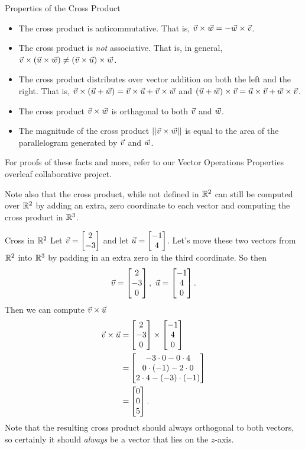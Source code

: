 \begin{definition}{\hypertarget{crossprops}{Properties of the Cross Product}}
\begin{itemize}
\item The cross product is anticommutative. That is, $\vec{v}\times\vec{w}=-\vec{w}\times\vec{v}$.
\vspace{1em}
\item The cross product is \textit{not} associative. That is, in general, $\vec{v}\times(\vec{u}\times\vec{w})\neq(\vec{v}\times\vec{u})\times\vec{w}$.
\vspace{1em}
\item The cross product distributes over vector addition on both the left and the right. That is, $\vec{v}\times(\vec{u}+\vec{w})=\vec{v}\times\vec{u}+\vec{v}\times\vec{w}$ and $(\vec{u}+\vec{w})\times\vec{v}=\vec{u}\times\vec{v}+\vec{w}\times\vec{v}$.
\vspace{1em}
\item The cross product $\vec{v}\times\vec{w}$ is orthagonal to both $\vec{v}$ and $\vec{w}$.
\vspace{1em}
\item The magnitude of the cross product $||\vec{v}\times\vec{w}||$ is equal to the area of the parallelogram generated by $\vec{v}$ and $\vec{w}$.
\vspace{1em}
\end{itemize}
For proofs of these facts and more, refer to our Vector Operations Properties overleaf collaborative project.
\end{definition}

Note also that the cross product, while not defined in $\mathbb{R}^2$ can still be computed over $\mathbb{R}^2$ by adding an extra, zero coordinate to each vector and computing the cross product in $\mathbb{R}^3$.

\begin{example}{Cross in $\mathbb{R}^2$}
Let $\vec{v}=\begin{bmatrix}2\\-3\end{bmatrix}$ and let $\vec{u}=\begin{bmatrix}-1\\4\end{bmatrix}$. Let's move these two vectors from $\mathbb{R}^2$ into $\mathbb{R}^3$ by padding in an extra zero in the third coordinate. So then $$\vcv=\bmat{2\\-3\\0},\ \vcu=\bmat{-1\\4\\0}. $$
Then we can compute $\vec{v}\times\vec{u}$
\begin{align*}
\vec{v}\times\vec{u}=&\begin{bmatrix}2\\-3\\0\end{bmatrix}\times\begin{bmatrix}-1\\4\\0\end{bmatrix}\\
=&\begin{bmatrix}-3\cdot0-0\cdot4\\0\cdot(-1)-2\cdot0\\2\cdot4-(-3)\cdot(-1)\end{bmatrix}\\
=&\begin{bmatrix}0\\0\\5\end{bmatrix}.
\end{align*}
Note that the resulting cross product should always orthogonal to both vectors, so certainly it should \textit{always} be a vector that lies on the $z$-axis.
\end{example}

